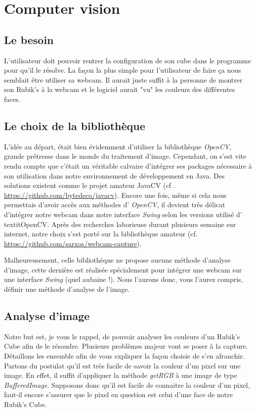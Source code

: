 \chapter{Computer vision}

\section{Le besoin}
L'utilisateur doit pouvoir rentrer la configuration de son cube dans le programme pour qu'il le résolve.
La façon la plus simple pour l'utilisateur de faire ça nous semblait être utiliser sa webcam.
Il aurait juste suffit à la personne de montrer son Rubik's à la webcam et le logiciel aurait "vu" les couleurs des différentes faces.

\section{Le choix de la bibliothèque}
L'idée au départ, était bien évidemment d'utiliser la bibliothèque \textit{OpenCV}, grande prêtresse dans le monde du traitement d'image.
Cependant, on s'est vite rendu compte que c'était un véritable calvaire d'intégrer ses packages nécessaire à son utilisation dans notre 
environnement de développement en Java. Des solutions existent comme le projet amateur JavaCV (cf . \url{https://github.com/bytedeco/javacv}).
Encore une fois, même si cela nous permettais d'avoir accès aux méthodes d' \textit{OpenCV}, il devient très délicat d'intégrer notre webcam
dans notre interface \textit{Swing} selon les versions utilisé d' textit{OpenCV}. Après des recherches laborieuse durant plusieurs semaine 
sur internet, notre choix s'est porté sur la bibliothèque amateur  (cf. \url{https://github.com/sarxos/webcam-capture}).

Malheureusement, celle bibliothèque ne propose aucune méthode d'analyse d'image, cette dernière est réalisée spécialement pour intégrer une webcam
sur une interface \textit{Swing} (quel aubaine !). Nous l'aurons donc, vous l'aurez compris, définir une méthode d'analyse de l'image.

\section{Analyse d'image}
Notre but est, je vous le rappel, de pouvoir analyser les couleurs d'un Rubik's Cube afin de le résoudre. Plusieurs problèmes majeur vont se poser à la capture.
Détaillons les ensemble afin de vous expliquer la façon choisie de s'en afranchir.
Partons du postulat qu'il est très facile de savoir la couleur d'un pixel sur une image.
En effet, il suffit d'appliquer la méthode \textit{getRGB} à une image de type \textit{BufferedImage}.
Supposons donc qu'il est facile de connaitre la couleur d'un pixel, faut-il encore s'assurer que le pixel en question est celui d'une face de notre Rubik's Cube.


